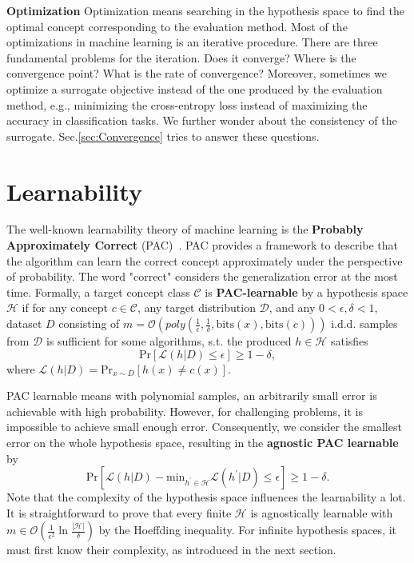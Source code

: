\documentclass[a4paper,11pt]{article}
\begin{document}
\textbf{Optimization} Optimization means searching in the hypothesis space to find the optimal concept corresponding to the evaluation method. Most of the optimizations in machine learning is an iterative procedure. There are three fundamental problems for the iteration. Does it converge? Where is the convergence point? What is the rate of convergence? Moreover, sometimes we optimize a surrogate objective instead of the one produced by the evaluation method, e.g., minimizing the cross-entropy loss instead of maximizing the accuracy in classification tasks. We further wonder about the consistency of the surrogate. Sec.\ref{sec:Convergence} tries to answer these questions.


\section{Learnability}
\label{sec:Learnability}

The well-known learnability theory of machine learning is the \textbf{Probably Approximately Correct} (PAC)~\citep{valiant1984theory}. PAC provides a framework to describe that the algorithm can learn the correct concept approximately under the perspective of probability. The word "correct" considers the generalization error at the most time. Formally, a target concept class $\mathcal{C}$ is \textbf{PAC-learnable} by a hypothesis space $\mathcal{H}$ if for any concept $c \in \mathcal{C}$, any target distribution $\mathcal{D}$, and any $0 < \epsilon, \delta < 1$, dataset $D$ consisting of $m = \mathcal{O}(poly(\frac{1}{\epsilon}, \frac{1}{\delta}, \mathrm{bits}(x), \mathrm{bits}(c)))$ i.d.d. samples from $\mathcal{D}$ is sufficient for some algorithms, s.t. the produced $h \in \mathcal{H}$ satisfies $$\mathrm{Pr}[\mathcal{L}(h|D) \le \epsilon] \ge 1 - \delta,$$ where $\mathcal{L}(h|D) = \mathrm{Pr}_{x \sim D}[h(x) \neq c(x)]$. 

PAC learnable means with polynomial samples, an arbitrarily small error is achievable with high probability. However, for challenging problems, it is impossible to achieve small enough error. Consequently, we consider the smallest error on the whole hypothesis space, resulting in the \textbf{agnostic PAC learnable}~\citep{kearns1994toward} by $$\mathrm{Pr}[\mathcal{L}(h|D) - \mathrm{min}_{h^\prime \in \mathcal{H}}\mathcal{L}(h^\prime|D) \le \epsilon] \ge 1 - \delta.$$ Note that the complexity of the hypothesis space influences the learnability a lot. It is straightforward to prove that every finite $\mathcal{H}$ is agnostically learnable with $m \in \mathcal{O}(\frac{1}{\epsilon^2}\ln\frac{|\mathcal{H}|}{\delta})$ by the Hoeffding inequality. For infinite hypothesis spaces, it must first know their complexity, as introduced in the next section.
\end{document}
